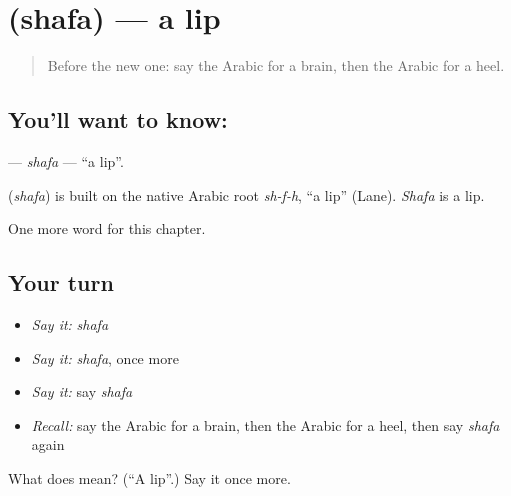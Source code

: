\section[\texorpdfstring{\ar{شفة} (shafa)}{شفة (shafa)}]{ (shafa) — a lip}

\label{lesson:AR-C140-shafa}



\begin{quote}
Before the new one: say the Arabic for a brain, then the Arabic for a heel.
\end{quote}

\subsection*{You'll want to know: }
\textbf{} — \emph{shafa} — \textquotedblleft{}a lip\textquotedblright{}.

\begin{cousinweb}
\textbf{} (\emph{shafa}) is built on the native Arabic root \emph{sh-f-h}, \textquotedblleft{}a lip\textquotedblright{} (Lane). \emph{Shafa} is a lip.
\end{cousinweb}

\begin{grammarlens}[title={What you've built}]
One more word for this chapter.
\end{grammarlens}

\subsection*{Your turn}
\begin{itemize}
\raggedright
  \item \emph{Say it:} \emph{shafa}
  \item \emph{Say it:} \emph{shafa}, once more
  \item \emph{Say it:} say \emph{shafa}
  \item \emph{Recall:} say the Arabic for a brain, then the Arabic for a heel, then say \emph{shafa} again
\end{itemize}

\begin{tcolorbox}[breakable,colback=teal!4,colframe=teal!35!black,title={Before you move on}]
What does  mean? (\textquotedblleft{}A lip\textquotedblright{}.) Say it once more.
\end{tcolorbox}
